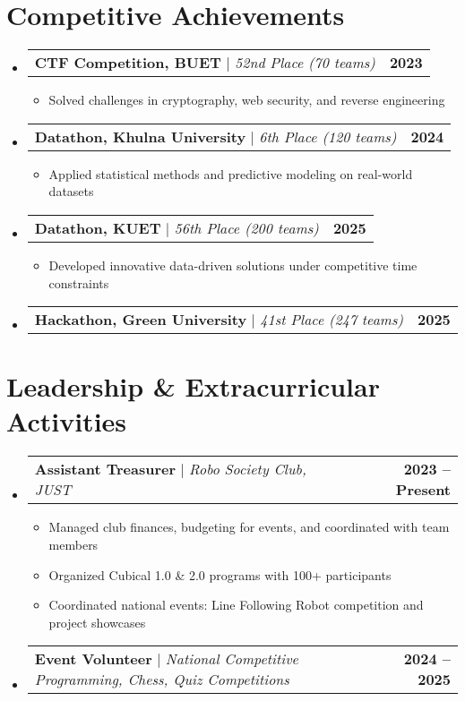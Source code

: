 \documentclass[letterpaper,11pt]{article}
\makeatletter
\newcommand{\resumeItem}[1]{
  \item\small{
    {#1 \vspace{-2pt}}
  }
}
\newcommand{\resumeProjectHeading}[2]{
    \item
    \begin{tabular*}{1.001\textwidth}{l@{\extracolsep{\fill}}r}
      \small#1 & \textbf{\small #2}\\
    \end{tabular*}\vspace{-7pt}
}
\newcommand{\resumeSubHeadingListStart}{\begin{itemize}[leftmargin=0.0in, label={}]}
\newcommand{\resumeSubHeadingListEnd}{\end{itemize}}
\newcommand{\resumeItemListStart}{\begin{itemize}}
\newcommand{\resumeItemListEnd}{\end{itemize}\vspace{-5pt}}
\makeatother
\begin{document}
\section{Competitive Achievements}
    \resumeSubHeadingListStart

    \resumeProjectHeading
          {\textbf{CTF Competition, BUET} $|$ \emph{52nd Place (70 teams)}}{2023}
          \resumeItemListStart
            \resumeItem{Solved challenges in cryptography, web security, and reverse engineering}
          \resumeItemListEnd
          \vspace{-13pt}
          
      \resumeProjectHeading
          {\textbf{Datathon, Khulna University} $|$ \emph{6th Place (120 teams)}}{2024}
          \resumeItemListStart
            \resumeItem{Applied statistical methods and predictive modeling on real-world datasets}
          \resumeItemListEnd
          \vspace{-13pt}
      
      \resumeProjectHeading
          {\textbf{Datathon, KUET} $|$ \emph{56th Place (200 teams)}}{2025}
          \resumeItemListStart
            \resumeItem{Developed innovative data-driven solutions under competitive time constraints}
          \resumeItemListEnd
          \vspace{-13pt}
      \resumeProjectHeading
          {\textbf{Hackathon, Green University} $|$ \emph{41st Place (247 teams)}}{2025}
    \resumeSubHeadingListEnd
\vspace{-15pt}

\section{Leadership \& Extracurricular Activities}
    \resumeSubHeadingListStart
      \resumeProjectHeading
          {\textbf{Assistant Treasurer} $|$ \emph{Robo Society Club, JUST}}{2023 -- Present}
          \resumeItemListStart
            \resumeItem{Managed club finances, budgeting for events, and coordinated with team members}
            \resumeItem{Organized Cubical 1.0 \& 2.0 programs with 100+ participants}
            \resumeItem{Coordinated national events: Line Following Robot competition and project showcases}
          \resumeItemListEnd
          \vspace{-13pt}
      \resumeProjectHeading
          {\textbf{Event Volunteer} $|$ \emph{National Competitive Programming, Chess, Quiz Competitions}}{2024 -- 2025}
    \resumeSubHeadingListEnd
\vspace{-12pt}
\end{document}
